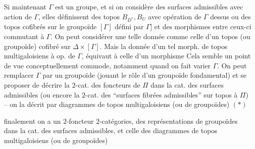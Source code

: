 Si maintenant $\Gamma$ est un groupe, et si on considère des surfaces admissibles avec action de $\Gamma$, elles définissent des topos  $B_{D^*},B_U$ avec opération de $\Gamma$ dessus \unsure{[|(}ou des topos cofibrés sur le groupoïde $[\Gamma]$ défini par $\Gamma$] et des morphismes entre ceux-ci commutant à $\Gamma$. On peut considérer une telle donnée comme celle d'un topos  (ou groupoïde) cofibré sur $\Delta\times[\Gamma]$.   Mais la donnée d'un tel morph. de topos multigaloisiens à op. de $\Gamma$, équivaut à celle d'un morphisme 
Cela semble un point de vue conceptuellement commode, notamment quand on fait varier $\Gamma$. On peut remplacer $\Gamma$ par un groupoïde  \inserted{$\Pi$} (jouant le rôle d'un groupoïde fondamental) et se proposer de décrire la $2$-cat.  des foncteurs de $\Pi$ dans la cat. des surfaces admissibles (ou encore la $2$-cat. des ``surfaces fibrées admissibles'' sur  topos    à $\Pi$) -- on la décrit par   diagrammes de topos multigaloisiens (ou de groupoïdes)
$(*)$

 finalement on a un $2$-foncteur   $2$-catégories,  des représentations de groupoïdes dans la cat. des surfaces admissibles, et celle des diagrammes de topos multigaloisiens (ou de groupoïdes)


